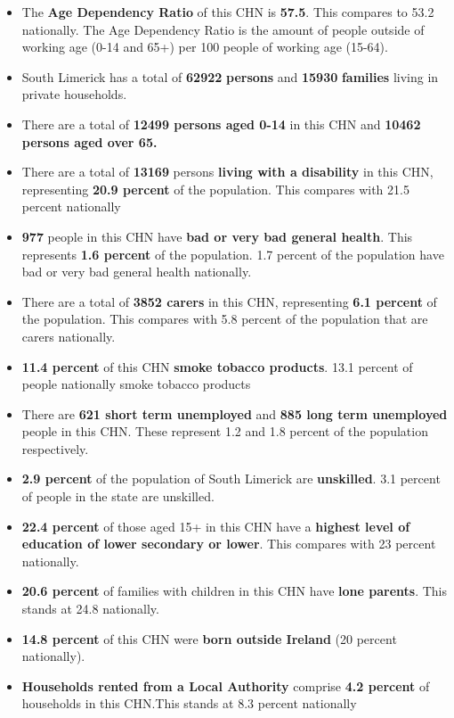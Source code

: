\documentclass{article}
\begin{document}
\begin{itemize}

\item The \textbf{Age Dependency Ratio} of this CHN is  \textbf{57.5}. This compares to 53.2 nationally. The Age Dependency Ratio is the amount of people outside of working age (0-14 and 65+) per 100 people of working age (15-64). 

\item South Limerick has a total of \textbf{\num{62922}} \textbf{persons} and  \textbf{\num{15930}} \textbf{families} living in private households.

\item There are a total of \textbf{\num{12499} persons aged 0-14} in this CHN and \textbf{\num{10462} persons aged over 65.} 

\item There are a total of \textbf{\num{13169}} persons \textbf{living with a disability} in this CHN, representing \textbf{20.9 percent} of the population. This compares with  21.5 percent nationally

\item \textbf{\num{977}} people in this CHN have \textbf{bad or very bad general health}. This represents \textbf{1.6 percent} of the population. 1.7 percent of the population have bad or very bad general health nationally. 

\item There are a total of \textbf{\num{3852} carers} in this CHN, representing \textbf{6.1 percent} of the population. This compares with 5.8 percent of the population that are carers nationally. 

\item \textbf{11.4 percent} of this CHN \textbf{smoke tobacco products}. 13.1 percent of people nationally smoke tobacco products

\item There are \textbf{\num{621} short term unemployed} and \textbf{\num{885} long term unemployed} people in this CHN. These represent 1.2 and 1.8 percent of the population respectively.

\item  \textbf{2.9 percent} of the population of South Limerick are \textbf{unskilled}. 3.1 percent of people in the state are unskilled.

\item \textbf{22.4 percent} of those aged 15+ in this CHN have a \textbf{highest level of education of lower secondary or lower}. This compares with 23 percent nationally. 

\item \textbf{20.6 percent} of families with children in this CHN have \textbf{lone parents}. This stands at 24.8 nationally.

\item \textbf{14.8 percent} of this CHN were \textbf{born outside Ireland} (20 percent nationally).

\item \textbf{Households rented from a Local Authority} comprise \textbf{4.2 percent} of households in this CHN.This stands at 8.3 percent nationally

\end{itemize}
\end{document}
